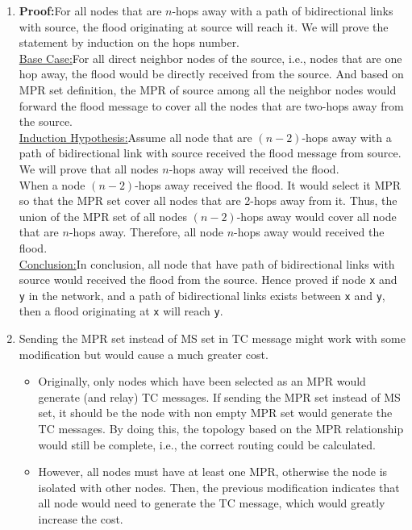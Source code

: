 \documentclass[12pt,titlepage,letterpaper]{article}
\begin{document}
\begin{enumerate}
    \item \textbf{Proof:}\qquad For all nodes that are $n$-hops away with a path
        of bidirectional links with source, the flood originating at source
        will reach it. We will prove the statement by induction on the hops
        number.\\
        \underline{Base Case:}\qquad For all direct neighbor nodes of the
        source, i.e., nodes that are one hop away, the flood would be directly
        received from the source. And based on MPR set definition, the MPR of
        source among all the neighbor nodes would forward the flood message to
        cover all the nodes that are two-hops away from the source.\\
        \underline{Induction Hypothesis:}\qquad Assume all node that are
        $(n-2)$-hops away with a path of bidirectional link with source
        received the flood message from source. We will prove that all nodes
        $n$-hops away will received the flood.\\
        When a node $(n-2)$-hops away received the flood. It would select it
        MPR so that the MPR set cover all nodes that are 2-hops away from it.
        Thus, the union of the MPR set of all nodes $(n-2)$-hops away would
        cover all node that are $n$-hops away. Therefore, all node $n$-hops
        away would received the flood.\\
        \underline{Conclusion:}\qquad In conclusion, all node that have path of
        bidirectional links with source would received the flood from the
        source. Hence proved if node \texttt{x} and \texttt{y} in the network,
        and a path of bidirectional links exists between \texttt{x} and
        \texttt{y}, then a flood originating at \texttt{x} will reach
        \texttt{y}.

    \item Sending the MPR set instead of MS set in TC message might work with
        some modification but would cause a much greater cost.
        \begin{itemize}
            \item Originally, only nodes which have been selected as an MPR
                would generate (and relay) TC messages. If sending the MPR set
                instead of MS set, it should be the node with non empty MPR set
                would generate the TC messages. By doing this, the topology
                based on the MPR relationship would still be complete, i.e.,
                the correct routing could be calculated.
            \item However, all nodes must have at least one MPR, otherwise the
                node is isolated with other nodes. Then, the previous
                modification indicates that all node would need to generate the
                TC message, which would greatly increase the cost.
        \end{itemize}
\end{enumerate}
\end{document}
